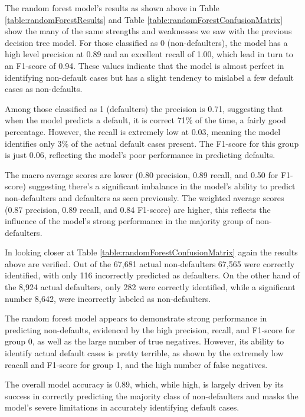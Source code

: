 \documentclass[12pt]{article}
\begin{document}
The random forest model's results as shown above in Table \ref{table:randomForestResults} and Table \ref{table:randomForestConfusionMatrix} show the many of the same strengths and weaknesses we saw with the previous decision tree model. For those classified as 0 (non-defaulters), the model has a high level precision at 0.89 and an excellent recall of 1.00, which lead in turn to an F1-score of 0.94. These values indicate that the model is almost perfect in identifying non-default cases but has a slight tendency to mislabel a few default cases as non-defaults.

Among those classified as 1 (defaulters) the precision is 0.71, suggesting that when the model predicts a default, it is correct 71\% of the time, a fairly good percentage. However, the recall is extremely low at 0.03, meaning the model identifies only 3\% of the actual default cases present. The F1-score for this group is just 0.06, reflecting the model's poor performance in predicting defaults.

The macro average scores are lower (0.80 precision, 0.89 recall, and 0.50 for F1-score) suggesting there's a significant imbalance in the model's ability to predict non-defaulters and defaulters as seen previously. The weighted average scores (0.87 precision, 0.89 recall, and 0.84 F1-score) are higher, this reflects the influence of the model's strong performance in the majority group of non-defaulters.

In looking closer at Table \ref{table:randomForestConfusionMatrix} again the results above are verified. Out of the 67,681 actual non-defaulters 67,565 were correctly identified, with only 116 incorrectly predicted as defaulters. On the other hand of the 8,924 actual defaulters, only 282 were correctly identified, while a significant number 8,642, were incorrectly labeled as non-defaulters.

The random forest model appears to demonstrate strong performance in predicting non-defaults, evidenced by the high precision, recall, and F1-score for group 0, as well as the large number of true negatives. However, its ability to identify actual default cases is pretty terrible, as shown by the extremely low reacall and F1-score for group 1, and the high number of false negatives.

The overall model accuracy is 0.89, which, while high, is largely driven by its success in correctly predicting the majority class of non-defaulters and masks the model's severe limitations in accurately identifying default cases.
\end{document}
